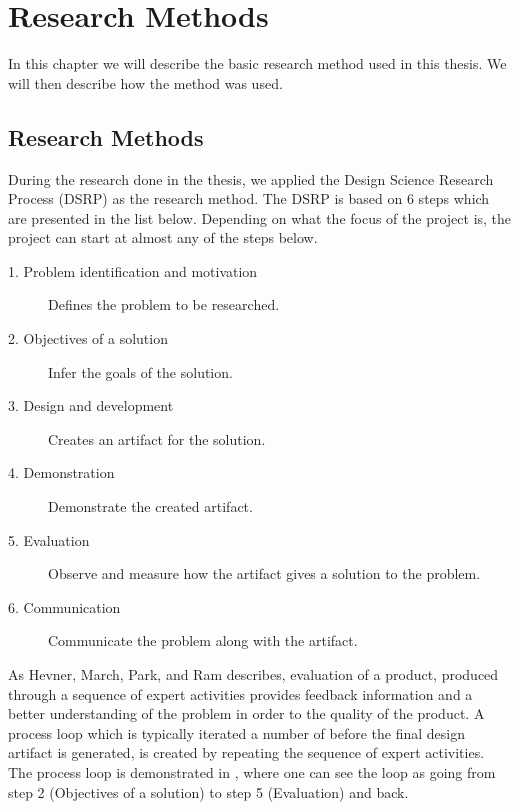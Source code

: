 
\chapter{Research Methods} %
\label{cha:research_questions_and_method}
In this chapter we will describe the basic research method used in this 
thesis. We will then describe how the method was used.
\section{Research Methods} %
\label{sec:research_method}

During the research done in the thesis, we applied the Design Science Research 
Process (DSRP) as the research method. The DSRP is based on 6 steps which are 
presented in the list below. Depending on what the focus of the project is, 
the project can start at almost any of the steps below.\cite{peffers2006design}

\begin{description}
	\item [1. Problem identification and motivation] Defines the problem to be
	researched. 
	\item [2. Objectives of a solution] Infer the goals of the solution.
	\item [3. Design and development] Creates an artifact for the solution.
	\item [4. Demonstration] Demonstrate the created artifact.
	\item [5. Evaluation] Observe and measure how the artifact gives a 
	solution to the problem.
	\item [6. Communication] Communicate the problem along with the artifact.
\end{description}

As Hevner, March, Park, and Ram \cite{von2004design} describes, 
evaluation of a product, produced through a sequence of expert activities 
provides feedback information and a better understanding of the problem in 
order to the quality of the product. A process loop which is typically 
iterated a number of before the final design artifact is generated, is created 
by repeating the sequence of expert activities. The process loop is 
demonstrated in , where one can see the loop as going 
from step 2 (Objectives of a solution) to step 5 (Evaluation) and back.\\

